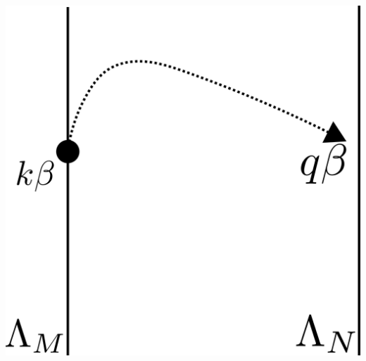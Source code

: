 \documentclass[14pt]{extarticle}
\numberwithin{equation}{section}
\begin{document}
\begin{minipage}{200pt}
\centering
\includegraphics[scale=0.3]{sc-2.png} 
\end{minipage}
\end{document}
